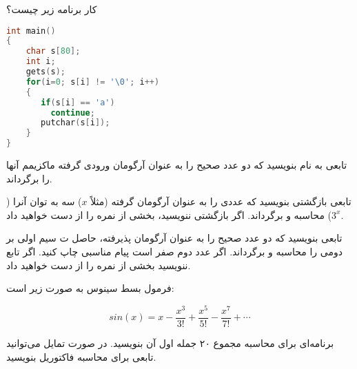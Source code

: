 \documentclass[12pt]{exam}
\begin{document}
\begin{questions}


\question[10]
کار برنامه زیر چیست؟ 
\begin{latin}
\begin{lstlisting}[language=C,breaklines=true]
int main()
{
    char s[80];
    int i;
    gets(s);
    for(i=0; s[i] != '\0'; i++)
    {
       if(s[i] == 'a') 
         continue;
       putchar(s[i]);
    }
}
\end{lstlisting}
\end{latin}


\question 
تابعی به نام 
بنویسید که دو عدد صحیح را به عنوان آرگومان ورودی گرفته ماکزیمم آنها را برگرداند.

\question[20]
تابعی بازگشتی بنویسید که عددی را به عنوان آرگومان گرفته (مثلاً $x$) سه به توان آنرا ($3^x$) محاسبه و برگرداند. اگر بازگشتی ننویسید، بخشی از نمره را از دست خواهید داد.

\question[20]
تابعی بنویسید که دو عدد صحیح را به عنوان آرگومان پذیرفته، حاصل ت
سیم اولی بر دومی را محاسبه و برگرداند. اگر عدد دوم صفر است پیام مناسبی چاپ کنید. اگر تابع ننویسید بخشی از نمره را از دست خواهید داد.

\question[30]
فرمول بسط سینوس به صورت زیر است:

\[ sin(x) = x - \frac{x^3}{3!} + \frac{x^5}{5!} - \frac{x^7}{7!} +  \cdots \]

برنامه‌ای برای محاسبه  مجموع ۲۰ جمله اول آن بنویسید.
در صورت تمایل می‌توانید تابعی برای محاسبه فاکتوریل بنویسید.

\end{questions}
\end{document}
